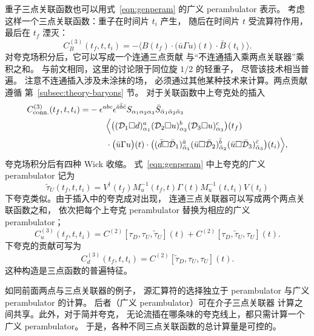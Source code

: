 重子三点关联函数也可以用式~\ref{eqn:genperam} 的广义
perambulator 表示。
考虑这样一个三点关联函数：重子在时间片 $t_i$ 产生，
随后在时间片 $t$ 受流算符作用，
最后在 $t_f$ 湮灭：
\begin{equation}
   C^{(3)}_B(t_f, t, t_i) = - \Big\langle B(t_f)\cdot \big(\bar{u}\Gamma u \big)(t) \cdot \bar{B}(t_i) \Big\rangle.
\end{equation}
对夸克场积分后，它可以写成一个连通三点贡献
与``不连通插入乘两点关联器''乘积之和。
与前文相同，这里的讨论限于同位旋 $1/2$ 的轻重子，
尽管该技术相当普遍。
注意不连通插入涉及未涂抹的场，
必须通过其他某种技术来计算。两点贡献遵循
第~\ref{subsec:theory-baryons} 节。
对于关联函数中上夸克处的插入
\begin{equation}
\begin{split}
   C^{(3)}_\mathrm{conn.}(t_f, t, t_i) =& -\epsilon^{abc}\epsilon^{\bar{a}\bar{b}\bar{c}} S_{\alpha_1\alpha_2 \alpha_3} \bar{S}_{\bar{\alpha}_1 \bar{\alpha}_2 \bar{\alpha}_3}\\
&\quad\quad\Big\langle \big(
({\cal D}_1\Box d)^a_{\alpha_1}
({\cal D}_2\Box u)^b_{\alpha_2}
({\cal D}_3\Box u)^c_{\alpha_3} \big)(t_f)\\&\quad\quad\cdot
\big(\bar{u}\Gamma u\big)(t)
\cdot \big( (\bar d\Box\bar{\cal D}_1)^{\bar{a}}_{\bar\alpha_1}
(\bar u\Box\bar{\cal D}_2)^{\bar{b}}_{\bar\alpha_2}
(\bar u\Box\bar{\cal D}_3)^{\bar{c}}_{\bar\alpha_3}\big)(t_i)
\Big\rangle,
\end{split}
\end{equation}
夸克场积分后有四种 Wick 收缩。
式~\ref{eqn:genperam} 中上夸克的广义 perambulator
记为
\begin{equation}
\widetilde{\tau}_U(t_f,t,t_i)  =
V^\dagger(t_f) M_u^{-1}(t_f,t)\Gamma(t) M_u^{-1}(t,t_i) V(t_i)
\end{equation}
下夸克类似。由于插入中的夸克成对出现，
连通三点关联器可以写成两个两点关联函数之和，
依次把每个上夸克 perambulator 替换为相应的广义 perambulator；
\begin{equation}
C^{(3)}_u(t_f,t,t_i) = C^{(2)}[\tau_D,\tau_U,\widetilde{\tau}_U](t) +
C^{(2)}[\tau_D,\widetilde{\tau}_U,\tau_U](t).
\end{equation}
下夸克的贡献可写为
\begin{equation}
C^{(3)}_d(t_f,t,t_i) = C^{(2)}[\widetilde{\tau}_D,\tau_U,\tau_U](t).
\end{equation}
这种构造是三点函数的普遍特征。

如同前面两点与三点关联器的例子，
源汇算符的选择独立于 perambulator 与广义 perambulator 的计算。
后者（广义 perambulator）可在介子三点关联器
计算之间共享。此外，对于简并夸克，
无论流插在哪条味的夸克线上，都只需计算一个广义 perambulator。
于是，各种不同三点关联函数的总计算量是可控的。

